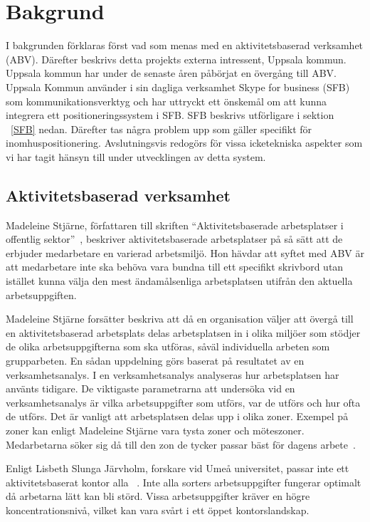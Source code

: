 \documentclass[a4paper,12pt]{article}
\begin{document}
 \section{Bakgrund}
 I bakgrunden förklaras först vad som menas med en aktivitetsbaserad verksamhet (ABV). Därefter beskrivs detta projekts externa intressent, Uppsala kommun. Uppsala kommun har under de senaste åren påbörjat en övergång till ABV. Uppsala Kommun använder i sin dagliga verksamhet Skype for business (SFB) som kommunikationsverktyg och har uttryckt ett önskemål om att kunna integrera ett positioneringssystem i SFB. SFB beskrivs utförligare i sektion ~\ref{SFB} nedan. Därefter tas några problem upp som gäller specifikt för inomhuspositionering. Avslutningsvis redogörs för vissa icketekniska aspekter som vi har tagit hänsyn till under utvecklingen av detta system.


 \subsection{Aktivitetsbaserad verksamhet}
 Madeleine Stjärne, författaren till skriften ``Aktivitetsbaserade
 arbetsplatser i offentlig sektor''~\cite{ABV}, beskriver aktivitetsbaserade arbetsplatser på så sätt att de erbjuder medarbetare en varierad arbetsmiljö. Hon hävdar att syftet med ABV är att medarbetare inte ska behöva vara bundna till ett specifikt skrivbord utan istället kunna välja den mest ändamålsenliga arbetsplatsen utifrån den aktuella arbetsuppgiften. %

 Madeleine Stjärne forsätter beskriva att då en organisation väljer att övergå till en aktivitetsbaserad arbetsplats delas arbetsplatsen in i olika miljöer som stödjer de olika arbetsuppgifterna som ska utföras, såväl individuella arbeten som grupparbeten. En sådan uppdelning görs baserat på resultatet av en verksamhetsanalys. I en verksamhetsanalys analyseras hur arbetsplatsen har använts tidigare. De viktigaste parametrarna att undersöka vid en verksamhetsanalys är vilka arbetsuppgifter som utförs, var de utförs och hur ofta de utförs. Det är vanligt att arbetsplatsen delas upp i olika zoner. Exempel på zoner kan enligt Madeleine Stjärne vara tysta zoner och möteszoner. Medarbetarna söker sig då till den zon de tycker passar bäst för dagens arbete~\cite{ABV}.

 Enligt Lisbeth Slunga Järvholm, forskare vid Umeå universitet, passar inte ett aktivitetsbaserat kontor alla ~\cite{passarInteAlla}. Inte alla sorters arbetsuppgifter fungerar optimalt då arbetarna lätt kan bli störd. Vissa arbetsuppgifter kräver en högre koncentrationsnivå, vilket kan vara svårt i ett öppet kontorslandskap.
\end{document}
